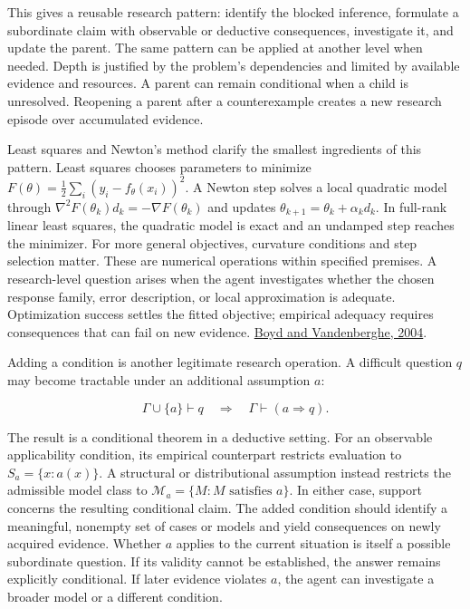 \documentclass[twoside,11pt]{article}
\begin{document}
This gives a reusable research pattern: identify the blocked inference, formulate a subordinate claim with observable or deductive consequences, investigate it, and update the parent. The same pattern can be applied at another level when needed. Depth is justified by the problem's dependencies and limited by available evidence and resources. A parent can remain conditional when a child is unresolved. Reopening a parent after a counterexample creates a new research episode over accumulated evidence.


Least squares and Newton's method clarify the smallest ingredients of this pattern. Least squares chooses parameters to minimize \(F(\theta)=\tfrac12\sum_i(y_i-f_\theta(x_i))^2\). A Newton step solves a local quadratic model through \(\nabla^2F(\theta_k)d_k=-\nabla F(\theta_k)\) and updates \(\theta_{k+1}=\theta_k+\alpha_kd_k\). In full-rank linear least squares, the quadratic model is exact and an undamped step reaches the minimizer. For more general objectives, curvature conditions and step selection matter. These are numerical operations within specified premises. A research-level question arises when the agent investigates whether the chosen response family, error description, or local approximation is adequate. Optimization success settles the fitted objective; empirical adequacy requires consequences that can fail on new evidence. \href{https://web.stanford.edu/~boyd/cvxbook/bv_cvxbook.pdf}{Boyd and Vandenberghe, 2004}.


Adding a condition is another legitimate research operation. A difficult question \(q\) may become tractable under an additional assumption \(a\):


\[
\Gamma\cup\{a\}\vdash q
\quad\Longrightarrow\quad
\Gamma\vdash(a\Rightarrow q).
\]


The result is a conditional theorem in a deductive setting. For an observable applicability condition, its empirical counterpart restricts evaluation to \(S_a=\{x:a(x)\}\). A structural or distributional assumption instead restricts the admissible model class to \(\mathcal M_a=\{M:M\text{ satisfies }a\}\). In either case, support concerns the resulting conditional claim. The added condition should identify a meaningful, nonempty set of cases or models and yield consequences on newly acquired evidence. Whether \(a\) applies to the current situation is itself a possible subordinate question. If its validity cannot be established, the answer remains explicitly conditional. If later evidence violates \(a\), the agent can investigate a broader model or a different condition.
\end{document}
